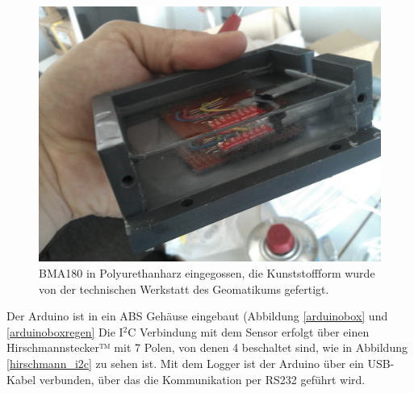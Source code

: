 \documentclass[12pt,a4paper]{scrartcl}
\begin{document}
\begin{figure}[htb]
\centering
\includegraphics[scale=.15]{hardwareimages/harz.jpg}
\caption{BMA180 in Polyurethanharz eingegossen, die Kunststoffform wurde von der technischen Werkstatt des Geomatikums gefertigt.}
\label{harz}
\end{figure}

Der Arduino ist in ein ABS Gehäuse \citep{Enclosures:2012uq} eingebaut (Abbildung \ref{arduinobox} und \ref{arduinoboxregen}
Die I$^2$C Verbindung mit dem Sensor erfolgt über einen Hirschmannstecker™ mit 7 Polen, von denen 4 beschaltet sind, wie in Abbildung \ref{hirschmann_i2c} zu sehen ist.
Mit dem Logger ist der Arduino über ein USB-Kabel verbunden, über das die Kommunikation per RS232 geführt wird.
\end{document}
